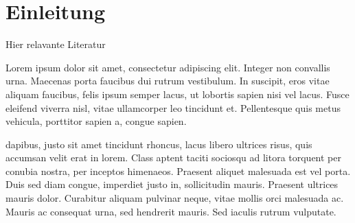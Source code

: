 \section{Einleitung}
Hier relavante Literatur

\cite{doi:10.1080/01441647.2018.1494640} Lorem ipsum dolor sit amet, consectetur adipiscing elit. Integer non convallis urna. Maecenas porta faucibus dui rutrum vestibulum. In suscipit, eros vitae aliquam faucibus, felis ipsum semper lacus, ut lobortis sapien nisi vel lacus. Fusce eleifend viverra nisl, vitae ullamcorper leo tincidunt et. Pellentesque quis metus vehicula, porttitor sapien a, congue sapien.

\cite{smith2015automated} \cite{stocker2017} dapibus, justo sit amet tincidunt rhoncus, lacus libero ultrices risus, quis accumsan velit erat in lorem. Class aptent taciti sociosqu ad litora torquent per conubia nostra, per inceptos himenaeos. Praesent aliquet malesuada est vel porta. Duis sed diam congue, imperdiet justo in, sollicitudin mauris. Praesent ultrices mauris dolor. Curabitur aliquam pulvinar neque, vitae mollis orci malesuada ac. Mauris ac consequat urna, sed hendrerit mauris. Sed iaculis rutrum vulputate. 
